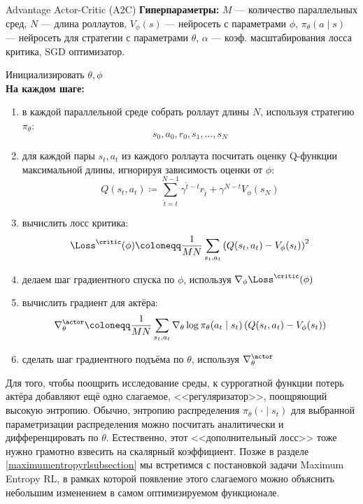 \begin{algorithm}{Advantage Actor-Critic (A2C)}
\textbf{Гиперпараметры:} $M$ --- количество параллельных сред, $N$ --- длина роллаутов, $V_\phi(s)$ --- нейросеть с параметрами $\phi$, $\pi_\theta(a \mid s)$ --- нейросеть для стратегии с параметрами $\theta$, $\alpha$ --- коэф. масштабирования лосса критика, SGD оптимизатор.

\vspace{0.3cm}
Инициализировать $\theta, \phi$ \\
\textbf{На каждом шаге:}
\begin{enumerate}
    \item в каждой параллельной среде собрать роллаут длины $N$, используя стратегию $\pi_{\theta}$:
    $$s_0, a_0, r_0, s_1, \dots , s_N$$
    \item для каждой пары $s_t, a_t$ из каждого роллаута посчитать оценку Q-функции максимальной длины, игнорируя зависимость оценки от $\phi$:
    $$Q(s_t, a_t) \coloneqq \sum_{\hat{t} = t}^{N-1} \gamma^{\hat{t} - t} r_{\hat{t}} + \gamma^{N - t} V_{\phi}(s_N)$$
    \item вычислить лосс критика:
    $$\Loss^{\critic}(\phi) \coloneqq \frac{1}{MN}\sum_{s_t, a_t} \left( Q(s_t, a_t) - V_\phi(s_t) \right) ^2$$
    \item делаем шаг градиентного спуска по $\phi$, используя $\nabla_\phi \Loss^{\critic}(\phi)$
    \item вычислить градиент для актёра:
    $$\nabla^{\actor}_\theta \coloneqq \frac{1}{MN}\sum_{s_t, a_t} \nabla_\theta \log \pi_\theta(a_t \mid s_t) \left( Q(s_t, a_t) - V_\phi(s_t) \right) $$
    \item сделать шаг градиентного подъёма по $\theta$, используя $\nabla^{\actor}_\theta$
\end{enumerate}
\end{algorithm}

\begin{remark}
Для того, чтобы поощрить исследование среды, к суррогатной функции потерь актёра добавляют ещё одно слагаемое, <<регуляризатор>>, поощряющий высокую энтропию. Обычно, энтропию распределения $\pi_{\theta}(\cdot \mid s_t)$ для выбранной параметризации распределения можно посчитать аналитически и дифференцировать по $\theta$. Естественно, этот <<дополнительный лосс>> тоже нужно грамотно взвесить на скалярный коэффициент. Позже в разделе \ref{maximumentropyrlsubsection} мы встретимся с постановкой задачи Maximum Entropy RL, в рамках которой появление этого слагаемого можно объяснить небольшим изменением в самом оптимизируемом функционале.
\end{remark}

